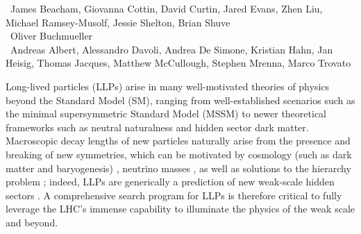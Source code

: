 ~James Beacham, Giovanna Cottin, David Curtin, Jared Evans, Zhen Liu, Michael Ramsey-Musolf, Jessie Shelton, Brian Shuve\\
~Oliver Buchmueller\\
~Andreas Albert, Alessandro Davoli, Andrea De Simone, Kristian Hahn, Jan Heisig, Thomas Jacques, Matthew McCullough, Stephen Mrenna, Marco Trovato


Long-lived particles (LLPs) arise in many well-motivated theories of physics beyond the Standard Model (SM), ranging from  well-established scenarios such as the minimal supersymmetric Standard Model (MSSM) to newer theoretical frameworks such as neutral naturalness and hidden sector dark matter.  Macroscopic decay lengths of new particles naturally arise from the presence and breaking of new symmetries, which can be motivated by cosmology (such as dark matter and baryogenesis) \cite{Bouquet:1986mq, Campbell:1990fa, Cui:2012jh, Barry:2013nva, Cui:2014twa, Ipek:2016bpf,Baumgart:2009tn, Kaplan:2009ag,
  Chan:2011aa, Dienes:2011ja, Dienes:2012yz, Kim:2013ivd}, neutrino masses \cite{Helo:2013esa, Antusch:2016vyf,Graesser:2007yj, Graesser:2007pc, Izaguirre:2015pga,Maiezza:2015lza, Batell:2016zod}, as well as solutions to the hierarchy problem  \cite{Giudice:1998bp,Burdman:2006tz, Cai:2008au, Chacko:2005pe,Fan:2011yu,Barbier:2004ez, Csaki:2013jza,Arvanitaki:2012ps, ArkaniHamed:2012gw}; indeed, LLPs are generically a prediction of new weak-scale hidden sectors \cite{Chen:1995yu,Thomas:1998wy,Feng:1999fu,Strassler:2006im,Strassler:2006ri,Strassler:2006qa,Han:2007ae,Strassler:2008bv,Strassler:2008fv}.  A comprehensive search program for LLPs is therefore critical to fully leverage the LHC's immense capability to illuminate the physics of the weak scale and beyond. 

